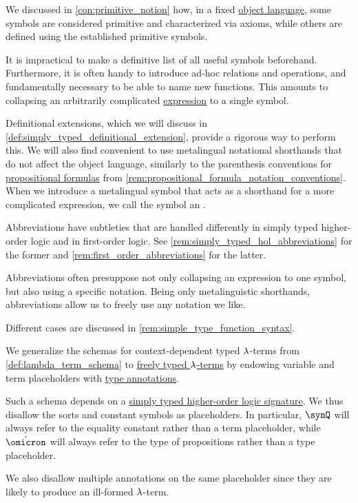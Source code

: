 \begin{concept}\label{con:metalingual_abbreviation}\mimprovised
  We discussed in \cref{con:primitive_notion} how, in a fixed \hyperref[con:metalogic]{object language}, some symbols are considered primitive and characterized via axioms, while others are defined using the established primitive symbols.

  It is impractical to make a definitive list of all useful symbols beforehand. Furthermore, it is often handy to introduce ad-hoc relations and operations, and fundamentally necessary to be able to name new functions. This amounts to collapsing an arbitrarily complicated \hyperref[con:expression]{expression} to a single symbol.

  Definitional extensions, which we will discuss in \cref{def:simply_typed_definitional_extension}, provide a rigorous way to perform this. We will also find convenient to use metalingual notational shorthands that do not affect the object language, similarly to the parenthesis conventions for \hyperref[def:propositional_syntax/formula]{propositional formulas} from \cref{rem:propositional_formula_notation_conventions}. When we introduce a metalingual symbol that acts as a shorthand for a more complicated expression, we call the symbol an .

  Abbreviations have subtleties that are handled differently in simply typed higher-order logic and in first-order logic. See \cref{rem:simply_typed_hol_abbreviations} for the former and \cref{rem:first_order_abbreviations} for the latter.
\end{concept}
\begin{comments}
  \item Abbreviations often presuppose not only collapsing an expression to one symbol, but also using a specific notation. Being only metalinguistic shorthands, abbreviations allow us to freely use any notation we like.

  Different cases are discussed in \cref{rem:simple_type_function_syntax}.
\end{comments}

\begin{definition}\label{def:freely_typed_lambda_term_schema}
  We generalize the schemas for context-dependent typed \( {\mathrm \lambda} \)-terms from \cref{def:lambda_term_schema} to \hyperref[def:freely_typed_lambda_term]{freely typed \( {\mathrm \lambda} \)-terms} by endowing variable and term placeholders with \hyperref[con:type_annotation]{type annotations}.

  Such a schema depends on a \hyperref[def:simply_typed_hol_signature]{simply typed higher-order logic signature}. We thus disallow the sorts and constant symbols as placeholders. In particular, \( \synQ \) will always refer to the equality constant rather than a term placeholder, while \( \syn\omicron \) will always refer to the type of propositions rather than a type placeholder.

  We also disallow multiple annotations on the same placeholder since they are likely to produce an ill-formed \( {\mathrm \lambda} \)-term.
\end{definition}


